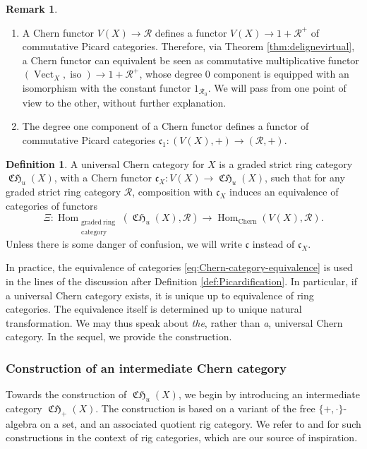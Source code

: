 \documentclass[11pt]{article}
\newcommand{\skpt}{\smallskip}
\theoremstyle{plain}
\theoremstyle{definition}
\newtheorem{definition}[theorem]{Definition}
\newtheorem{remark}[theorem]{Remark}
\newcommand{\Rcal}{\mathcal R}
\newcommand{\cfrak}{\mathfrak c}
\DeclareMathOperator{\CHfrak}{\mathfrak{CH}}
\DeclareMathOperator{\Hom}{Hom}
\DeclareMathOperator{\iso}{iso}
\DeclareMathOperator{\Vect}{Vect}
\begin{document}
\skpt
\begin{remark}\label{rmk:superficial-remarks-Chern-functors}
\begin{enumerate}
\item\label{rmk:supremChfun-1} A Chern functor $ V(X)\to\Rcal$ defines a functor $V(X)\to 1+\Rcal^{+}$ of commutative Picard categories. Therefore, via Theorem \ref{thm:delignevirtual}, a Chern functor can equivalent be seen as commutative multiplicative functor $(\Vect_{X},\iso)\to 1+\Rcal^{+}$, whose degree 0 component is equipped with an isomorphism with the constant functor $1_{\Rcal_{0}}$. We will pass from one point of view to the other, without further explanation.
\item\label{rmk:supremChfun-2} The degree one component of a Chern functor defines a functor of commutative Picard categories $\cfrak_{1}\colon (V(X),+)\to (\Rcal,+)$.
\end{enumerate}
\end{remark}

\begin{definition}\label{def:universal-chern-category}
A universal Chern category for $X$ is a graded strict ring category $\CHfrak_{u}(X)$, with a Chern functor $\cfrak_{X}\colon V(X)\to\CHfrak_{u}(X)$, such that for any graded strict ring category $\Rcal$, composition with $\cfrak_{X}$ induces an equivalence of categories of functors
\begin{equation}\label{eq:Chern-category-equivalence}
\Xi: \Hom_{\substack{\mathrm{graded\ ring}\\ \mathrm{category}}}(\CHfrak_{u}(X), \Rcal) \to \Hom_{\mathrm{Chern}}(V(X), \Rcal).
\end{equation}
Unless there is some danger of confusion, we will write $\cfrak$ instead of $\cfrak_{X}$.
\end{definition}

In practice, the equivalence of categories \eqref{eq:Chern-category-equivalence} is used in the lines of the discussion after Definition \ref{def:Picardification}. In particular, if a universal Chern category exists, it is unique up to equivalence of ring categories. The equivalence itself is determined up to unique natural transformation. We may thus speak about \emph{the}, rather than \emph{a}, universal Chern category. In the sequel, we provide the construction.

\subsubsection{Construction of an intermediate Chern category}\label{subsubsec:intermediate-category} Towards the construction of $\CHfrak_{u}(X)$, we begin by introducing an intermediate category $\CHfrak_{+}(X)$. The construction is based on a variant of the free $\lbrace +,\cdot\rbrace$-algebra on a set, and an associated quotient rig category. We refer to \cite[]{Laplaza} and \cite[Volume I, Chapter 3]{Johnson-Yau} for such constructions in the context of rig categories, which are our source of inspiration.
\end{document}

